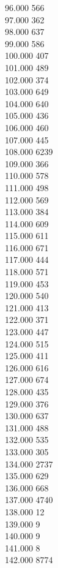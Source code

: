 { 96.000	566 \\
 97.000	362 \\
 98.000	637 \\
 99.000	586 \\
 100.000	407 \\
 101.000	489 \\
 102.000	374 \\
 103.000	649 \\
 104.000	640 \\
 105.000	436 \\
 106.000	460 \\
 107.000	445 \\
 108.000	6239 \\
 109.000	366 \\
 110.000	578 \\
 111.000	498 \\
 112.000	569 \\
 113.000	384 \\
 114.000	609 \\
 115.000	611 \\
 116.000	671 \\
 117.000	444 \\
 118.000	571 \\
 119.000	453 \\
 120.000	540 \\
 121.000	413 \\
 122.000	371 \\
 123.000	447 \\
 124.000	515 \\
 125.000	411 \\
 126.000	616 \\
 127.000	674 \\
 128.000	435 \\
 129.000	376 \\
 130.000	637 \\
 131.000	488 \\
 132.000	535 \\
 133.000	305 \\
 134.000	2737 \\
 135.000	629 \\
 136.000	668 \\
 137.000	4740 \\
 138.000	12 \\
 139.000	9 \\
 140.000	9 \\
 141.000	8 \\
 142.000	8774 \\
}
